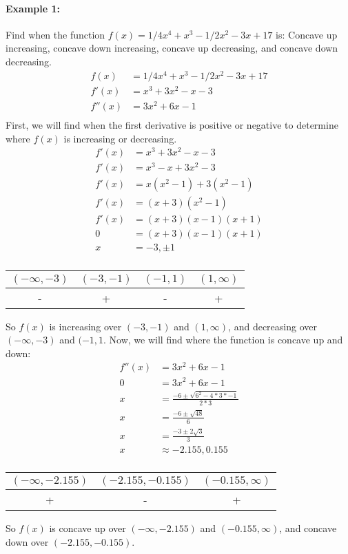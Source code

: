 \documentclass[../revisedmain.tex]{subfiles}
\begin{document}
\paragraph{Example 1:} Find when the function \(f(x)=1/4x^4+x^3-1/2x^2-3x+17\) is: Concave up increasing, concave down increasing, concave up decreasing, and concave down decreasing.
\begin{equation}
	\begin{split}
	f(x)&=1/4x^4+x^3-1/2x^2-3x+17\\
	f'(x)&=x^3+3x^2-x-3\\
	f''(x)&=3x^2+6x-1 \\
	\end{split}
\end{equation}First, we will find when the first derivative is positive or negative to determine where \(f(x)\) is increasing or decreasing.
\begin{equation}
	\begin{split}
	f'(x)&=x^3+3x^2-x-3\\
	f'(x)&=x^3-x+3x^2-3\\
	f'(x)&=x(x^2-1)+3(x^2-1)\\
	f'(x)&=(x+3)(x^2-1)\\
	f'(x)&=(x+3)(x-1)(x+1)\\
	0&=(x+3)(x-1)(x+1)\\
	x&=-3,\pm 1 \\
	\end{split}
\end{equation}
\begin{center}\begin{tabular}{|c|c|c|c|}
	\hline
	\((-\infty ,-3)\) & \((-3,-1)\) &\((-1,1)\) & \((1,\infty)\)\\
	\hline
	-&+&-&+\\
	\hline
\end{tabular}\end{center}
So \(f(x)\) is increasing over \((-3,-1)\) and \((1,\infty)\), and decreasing over \((-\infty,-3)\) and \((-1,1\). Now, we will find where the function is concave up and down:
\begin{equation}
	\begin{split}
	f''(x)&=3x^2+6x-1\\
	0&=3x^2+6x-1\\
	x&=\frac{-6\pm \sqrt{6^2-4*3*-1}}{2*3}\\
	x&=\frac{-6\pm\sqrt{48}}{6}\\
	x&=\frac{-3\pm 2\sqrt{3}}{3}\\
	x&\approx -2.155, 0.155 \\
	\end{split}
\end{equation}
\begin{center}\begin{tabular}{|c|c|c|}
	\hline
	\((-\infty,-2.155)\) & \((-2.155,-0.155)\) & \((-0.155,\infty)\) \\
	\hline
	+&-&+\\
	\hline
\end{tabular}\end{center}So \(f(x)\) is concave up over \((-\infty,-2.155)\) and \((-0.155,\infty)\), and concave down over \((-2.155,-0.155)\).
\end{document}
